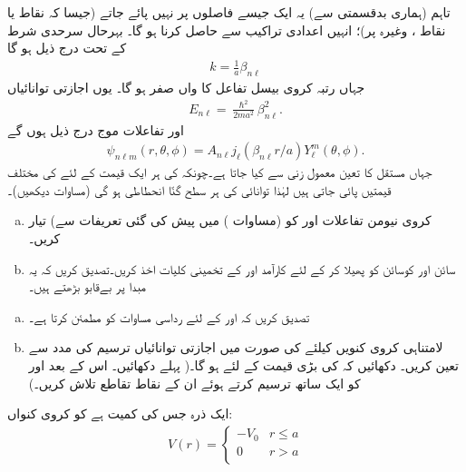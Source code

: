  تاہم (ہماری بدقسمتی سے) یہ ایک جیسے فاصلوں پر نہیں پائے جاتے (جیسا کہ نقاط  یا نقاط ، وغیرہ پر)؛ انہیں اعدادی تراکیب سے حاصل کرنا ہو گا۔ بہرحال سرحدی شرط کے تحت درج ذیل ہو گا
\begin{align}
k=\frac{1}{a}\beta_{n\ell} 
\end{align}
جہاں  رتبہ  کروی بیسل تفاعل کا  واں صفر ہو گا۔ یوں اجازتی توانائیاں 
\begin{align}\label{مساوات_ابعاد_کروی_کنواں_اجازتی_توانائیاں}
E_{n\ell}=\frac{\hslash^{2}}{2ma^{2}}\beta_{n\ell}^{2}. 
\end{align}
اور تفاعلات موج درج ذیل ہوں گے 
\begin{align}
\psi_{n\ell m}(r,\theta,\phi)=A_{n\ell}j_{\ell}(\beta_{n\ell}r/a)Y_{\ell}^{m}(\theta,\phi). 
\end{align}
جہاں مستقل  کا تعین معمول زنی سے کیا جاتا ہے۔چونکہ  کی ہر ایک قیمت کے لئے  کی 
مختلف قیمتیں پائی جاتی ہیں لہٰذا توانائی کی ہر سطح  گنّا انحطاطی ہو گی (مساوات  دیکھیں)۔
\begin{enumerate}[a.]
\item
کروی نیومن تفاعلات  اور  کو (مساوات ) میں پیش کی گئی تعریفات سے) تیار کریں۔
\item
سائن اور کوسائن کو پھیلا کر  کے لئے كارآمد  اور  کے تخمینی کلیات اخذ کریں۔تصدیق کریں کہ یہ مبدا پر بےقابو بڑھتے ہیں۔
\end{enumerate}
%
\begin{enumerate}[a.]
\item
 تصدیق کریں کہ  اور  کے لئے  رداسی مساوات کو مطمئن کرتا ہے۔
\item
لامتناہی کروی کنویں کیلئے  کی صورت میں اجازتی توانائیاں ترسیم کی مدد سے تعین کریں۔ دکھائیں کہ  کی بڑی قیمت کے لئے 
 ہو گا۔( پہلے 
 دکھائیں۔ اس کے بعد  اور  کو ایک ساتھ ترسیم کرتے ہوئے ان کے نقاط تقاطع تلاش کریں۔)
\end{enumerate}
%
 ایک ذرہ جس کی کمیت  ہے کو  کروی کنواں:
\begin{align*}
V(r)=\begin{cases}-V_{0}&r\le a\\0&r>a\\\end{cases} 
\end{align*}
